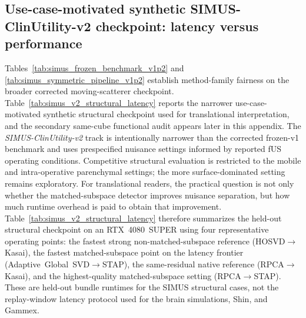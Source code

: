 \subsection{Use-case-motivated synthetic SIMUS-ClinUtility-v2 checkpoint: latency versus performance}
\label{app:simus-v2-latency}
Tables~\ref{tab:simus_frozen_benchmark_v1p2} and \ref{tab:simus_symmetric_pipeline_v1p2} establish method-family fairness on the broader corrected moving-scatterer checkpoint. Table~\ref{tab:simus_v2_structural_latency} reports the narrower use-case-motivated synthetic structural checkpoint used for translational interpretation, and the secondary same-cube functional audit appears later in this appendix. The \emph{SIMUS-ClinUtility-v2} track is intentionally narrower than the corrected frozen-v1 benchmark and uses prespecified nuisance settings informed by reported fUS operating conditions. Competitive structural evaluation is restricted to the mobile and intra-operative parenchymal settings; the more surface-dominated setting remains exploratory. For translational readers, the practical question is not only whether the matched-subspace detector improves nuisance separation, but how much runtime overhead is paid to obtain that improvement. Table~\ref{tab:simus_v2_structural_latency} therefore summarizes the held-out structural checkpoint on an RTX~4080~SUPER using four representative operating points: the fastest strong non-matched-subspace reference (\mbox{HOSVD$\rightarrow$Kasai}), the fastest matched-subspace point on the latency frontier (\mbox{Adaptive~Global~SVD$\rightarrow$STAP}), the same-residual native reference (\mbox{RPCA$\rightarrow$Kasai}), and the highest-quality matched-subspace setting (\mbox{RPCA$\rightarrow$STAP}). These are held-out bundle runtimes for the SIMUS structural cases, not the replay-window latency protocol used for the brain simulations, Shin, and Gammex.

